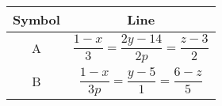 \begin{tabular}{|c|c|}
\hline
\textbf{Symbol} & \textbf{Line} \\
\hline
A & $\dfrac{1-x}{3}=\dfrac{2y-14}{2p}=\dfrac{z-3}{2}$ \\ \hline
B & $\dfrac{1-x}{3p}=\dfrac{y-5}{1}=\dfrac{6-z}{5}$ \\ \hline
\end{tabular}
